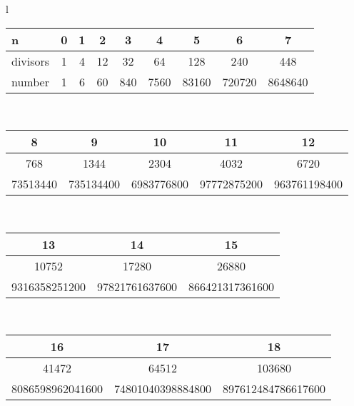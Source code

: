 \begin{center}
\begin{tabular}{l}
\begin{tabular}{l|c c c c c c c c}
n & 0 & 1 & 2 & 3 & 4 & 5 & 6 & 7 \\
\hline
divisors & 1 & 4 & 12 & 32 & 64 & 128 & 240 & 448 \\
\hline
number & \scriptsize{1} & \scriptsize{6} & \scriptsize{60} & \scriptsize{840} & \scriptsize{7560} & \scriptsize{83160} & \scriptsize{720720} & \scriptsize{8648640} \\
\end{tabular}\\[1ex]
\begin{tabular}{c c c c c}
8 & 9 & 10 & 11 & 12 \\
\hline
768 & 1344 & 2304 & 4032 & 6720 \\
\hline
\scriptsize{73513440} & \scriptsize{735134400} & \scriptsize{6983776800} & \scriptsize{97772875200} & \scriptsize{963761198400} \\
\end{tabular}\\[1ex]
\begin{tabular}{c c c}
13 & 14 & 15 \\
\hline
10752 & 17280 & 26880 \\
\hline
\scriptsize{9316358251200} & \scriptsize{97821761637600} & \scriptsize{866421317361600} \\
\end{tabular}\\[1ex]
\begin{tabular}{c c c}
16 & 17 & 18 \\
\hline
41472 & 64512 & 103680 \\
\hline
\scriptsize{8086598962041600} & \scriptsize{74801040398884800} & \scriptsize{897612484786617600} \\
\end{tabular}
\end{tabular}
\end{center}
